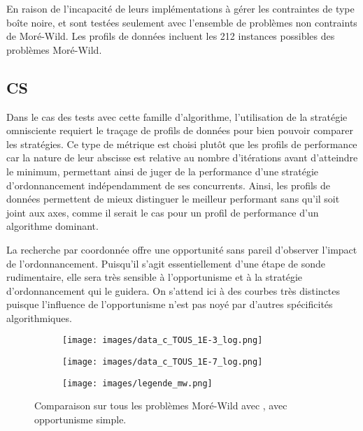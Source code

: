 En raison de l'incapacité de leurs implémentations à gérer les contraintes de type boîte noire, \GSS et \imfil sont testées seulement avec l'ensemble de problèmes non contraints de Moré-Wild. Les profils de données incluent les 212 instances possibles des problèmes Moré-Wild. 
\subsection{CS}\label{sec:ccs}
Dans le cas des tests avec cette famille d'algorithme, l'utilisation de la stratégie omnisciente requiert le traçage de profils de données pour bien pouvoir comparer les stratégies. Ce type de métrique est choisi plutôt que les profils de performance car la nature de leur abscisse est relative au nombre d'itérations avant d'atteindre le minimum, permettant ainsi de juger de la performance d'une stratégie d'ordonnancement indépendamment de ses concurrents. Ainsi, les profils de données permettent de mieux distinguer le meilleur performant sans qu'il soit joint aux axes, comme il serait le cas pour un profil de performance d'un algorithme dominant.

La recherche par coordonnée offre une opportunité sans pareil d'observer l'impact de l'ordonnancement. Puisqu'il s'agit essentiellement d'une étape de sonde rudimentaire, elle sera très sensible à l'opportunisme et à la stratégie d'ordonnancement qui le guidera. On s'attend ici à des courbes très distinctes puisque l'influence de l'opportunisme n'est pas noyé par d'autres spécificités algorithmiques.

\begin{figure}[!htb]
	\centering
	\begin{subfigure}{0.43\textwidth}
		\texttt{[image: images/data\_c\_TOUS\_1E-3\_log.png]}
		\label{fig:data_c_TOUS_1E-3_log}
	\end{subfigure}%
	\begin{subfigure}{0.43\textwidth}
		\texttt{[image: images/data\_c\_TOUS\_1E-7\_log.png]}
		\label{fig:data_c_TOUS_1E-7_log}
	\end{subfigure}
	\smallskip
	\begin{subfigure}{0.95\textwidth}
		\texttt{[image: images/legende\_mw.png]}
	\end{subfigure}
	\caption{Comparaison sur tous les problèmes Moré-Wild avec \CS, avec opportunisme simple.}
	\label{fig:csmw}
\end{figure}

